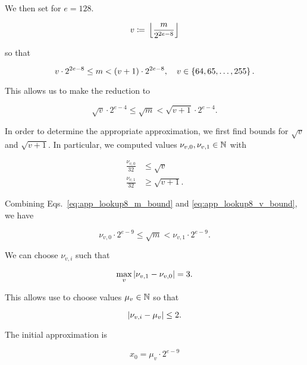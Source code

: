 \noindent
We then set
for $e = 128$.

\begin{equation}
    v \coloneqq{} \left\lfloor \frac{m}{2^{2e-8}} \right\rfloor
\end{equation}

\noindent
so that

\begin{equation}
    v\cdot2^{2e-8} \le m < \left( v+1 \right)\cdot2^{2e-8},
    \quad v\in\left\{ 64, 65, \dots, 255 \right\}.
\end{equation}

\noindent
This allows us to make the reduction to

\begin{equation}
    \sqrt{v}\cdot2^{e-4} \le \sqrt{m} < \sqrt{v+1}\cdot2^{e-4}.
    \label{eq:app_lookup8_m_bound}
\end{equation}

In order to determine the appropriate approximation,
we first find bounds for $\sqrt{v}$ and $\sqrt{v+1}$.
In particular, we computed values $\nu_{v,0}, \nu_{v,1}\in\mathbb{N}$ with

\begin{align}
    \frac{\nu_{v,0}}{32} &\le \sqrt{v} \nonumber\\
    \frac{\nu_{v,1}}{32} &\ge \sqrt{v+1}.
    \label{eq:app_lookup8_v_bound}
\end{align}

\noindent
Combining Eqs.~\eqref{eq:app_lookup8_m_bound} and
\eqref{eq:app_lookup8_v_bound},
we have

\begin{equation}
    \nu_{v,0}\cdot2^{e-9} \le \sqrt{m} < \nu_{v,1}\cdot2^{e-9}.
\end{equation}

\noindent
We can choose $\nu_{v,i}$ such that

\begin{equation}
    \max_{v} \left| \nu_{v,1} - \nu_{v,0} \right| = 3.
\end{equation}

\noindent
This allows use to choose values $\mu_{v}\in\mathbb{N}$ so that

\begin{equation}
    \left| \nu_{v,i} - \mu_{v} \right| \le 2.
\end{equation}

The initial approximation is

\begin{equation}
    x_{0} = \mu_{v}\cdot2^{e-9}
\end{equation}

